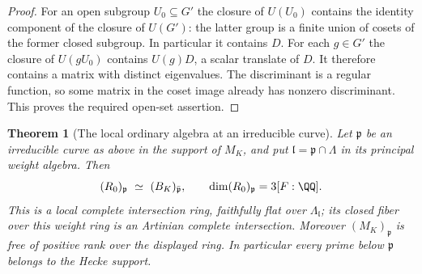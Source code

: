 \documentclass[a4paper,11pt]{article}
\newtheorem{theorem}[proposition]{Theorem}
\theoremstyle{definition}
\theoremstyle{remark}
\numberwithin{equation}{section}
\begin{document}
\begin{proof}
For an open subgroup \(U_0\subseteq G'\) the closure of
\(U(U_0)\) contains the identity component of the closure
of \(U(G')\): the latter group is a finite union of cosets of
the former closed subgroup. In particular it contains \(D\).
For each \(g\in G'\) the closure of \(U(gU_0)\) contains
\(U(g)D\), a scalar translate of \(D\). It therefore contains
a matrix with distinct eigenvalues. The discriminant is a
regular function, so some matrix in the coset image already
has nonzero discriminant. This proves the required open-set
assertion.
\end{proof}

\begin{theorem}[The local ordinary algebra at an irreducible curve]\leavevmode
\label{thm:completehecke418}
Let \(\mathfrak p\) be an irreducible curve as above in the
support of \(M_K\), and put \(\mathfrak l=\mathfrak p\cap\Lambda\)
in its principal weight algebra. Then
\[
       (R_0)_{\mathfrak p}\ \simeq\ (B_K)_{\bar{\mathfrak p}},
       \qquad \dim (R_0)_{\mathfrak p}=3[F:\QQ].
\]
This is a local complete intersection ring, faithfully flat
over \(\Lambda_{\mathfrak l}\); its closed fiber over this
weight ring is an Artinian complete intersection. Moreover
\((M_K)_{\mathfrak p}\) is free of positive rank over the
displayed ring. In particular every prime below
\(\mathfrak p\) belongs to the Hecke support.
\end{theorem}
\end{document}
